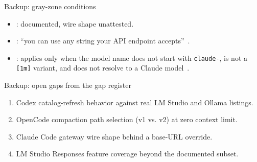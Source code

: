 \documentclass[aspectratio=169,11pt]{beamer}
\begin{document}
\begin{frame}{Backup: gray-zone conditions}
  \begin{itemize}
    \item {}: documented, wire shape unattested.
    \item {}: ``you can use any string
    your API endpoint accepts''~\citep{claudeCodeModelDocs}.
    \item {}: applies only when the
    model name does not start with \texttt{claude-}, is not a
    \texttt{[1m]} variant, and does not resolve to a Claude
    model~\citep{claudeCodeModelDocs}.
  \end{itemize}
\end{frame}

\begin{frame}{Backup: open gaps from the gap register}
  \begin{enumerate}
    \item Codex catalog-refresh behavior against real LM Studio and
    Ollama listings.
    \item OpenCode compaction path selection (v1 vs. v2) at zero context
    limit.
    \item Claude Code gateway wire shape behind a base-URL override.
    \item LM Studio Responses feature coverage beyond the documented
    subset.
  \end{enumerate}
\end{frame}
\end{document}
